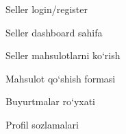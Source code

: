 Seller login/register

Seller dashboard sahifa

Seller mahsulotlarni ko‘rish

Mahsulot qo‘shish formasi

Buyurtmalar ro‘yxati

Profil sozlamalari
